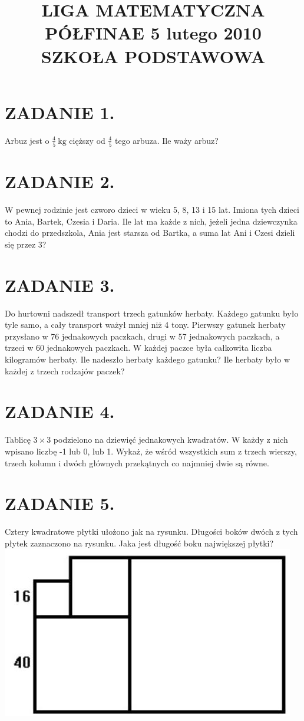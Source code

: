 \documentclass[10pt]{article}
\title{LIGA MATEMATYCZNA \\
 PÓŁFINAE 5 lutego 2010 \\
 SZKOŁA PODSTAWOWA }
\author{}
\date{}
\begin{document}
\maketitle
\section*{ZADANIE 1.}
Arbuz jest o \(\frac{4}{5} \mathrm{~kg}\) cięższy od \(\frac{4}{5}\) tego arbuza. Ile waży arbuz?

\section*{ZADANIE 2.}
W pewnej rodzinie jest czworo dzieci w wieku 5, 8, 13 i 15 lat. Imiona tych dzieci to Ania, Bartek, Czesia i Daria. Ile lat ma każde z nich, jeżeli jedna dziewczynka chodzi do przedszkola, Ania jest starsza od Bartka, a suma lat Ani i Czesi dzieli się przez 3?

\section*{ZADANIE 3.}
Do hurtowni nadszedł transport trzech gatunków herbaty. Każdego gatunku było tyle samo, a cały transport ważył mniej niż 4 tony. Pierwszy gatunek herbaty przysłano w 76 jednakowych paczkach, drugi w 57 jednakowych paczkach, a trzeci w 60 jednakowych paczkach. W każdej paczce była całkowita liczba kilogramów herbaty. Ile nadeszło herbaty każdego gatunku? Ile herbaty było w każdej z trzech rodzajów paczek?

\section*{ZADANIE 4.}
Tablicę \(3 \times 3\) podzielono na dziewięć jednakowych kwadratów. W każdy z nich wpisano liczbę -1 lub 0, lub 1. Wykaż, że wśród wszystkich sum z trzech wierszy, trzech kolumn i dwóch głównych przekątnych co najmniej dwie są równe.

\section*{ZADANIE 5.}
Cztery kwadratowe płytki ułożono jak na rysunku. Długości boków dwóch z tych płytek zaznaczono na rysunku. Jaka jest długość boku największej płytki?\\
\includegraphics[max width=\textwidth, center]{2024_11_21_d884d372f0f6df0e5406g-1}
\end{document}
